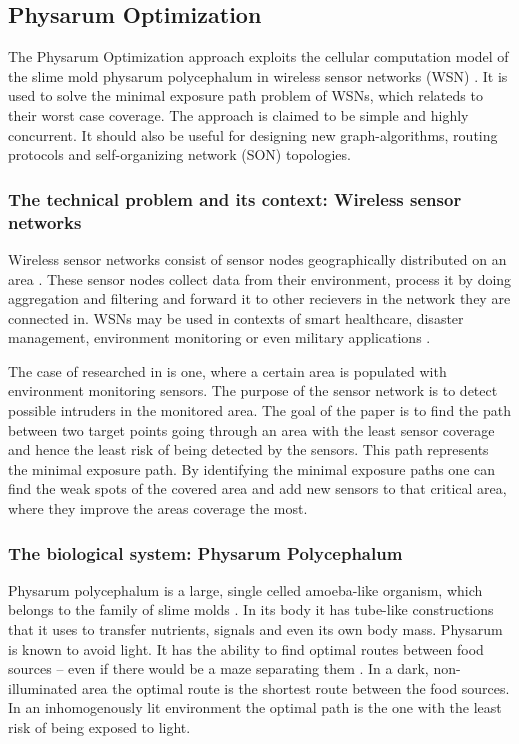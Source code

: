 \documentclass{IWORK2014}
\begin{document}

\subsection{Physarum Optimization}
The Physarum Optimization approach exploits the cellular computation model of the slime mold physarum polycephalum in wireless sensor networks (WSN) \cite{liu2012physarum}. It is used to solve the minimal exposure path problem of WSNs, which relateds to their worst case coverage. The approach is claimed to be simple and highly concurrent. It should also be useful for designing new graph-algorithms, routing protocols and self-organizing network (SON) topologies.

\subsubsection{The technical problem and its context: Wireless sensor networks}
Wireless sensor networks consist of sensor nodes geographically distributed on an area \cite{nazi2013robust}. These sensor nodes collect data from their environment, process it by doing aggregation and filtering and forward it to other recievers in the network they are connected in. WSNs may be used in contexts of smart healthcare, disaster management, environment monitoring \cite{nazi2013robust} or even military applications \cite{liu2012physarum}.

The case of researched in \cite{liu2012physarum} is one, where a certain area is populated with environment monitoring sensors. The purpose of the sensor network is to detect possible intruders in the monitored area. The goal of the paper is to find the path between two target points going through an area with the least sensor coverage and hence the least risk of being detected by the sensors. This path represents the minimal exposure path. By identifying the minimal exposure paths one can find the weak spots of the covered area and add new sensors to that critical area, where they improve the areas coverage the most.

\subsubsection{The biological system: Physarum Polycephalum}
Physarum polycephalum is a large, single celled amoeba-like organism, which belongs to the family of slime molds \cite{liu2012physarum}. In its body it has tube-like constructions that it uses to transfer nutrients, signals and even its own body mass. Physarum is known to avoid light. It has the ability to find optimal routes between food sources -- even if there would be a maze separating them \cite{nakagaki2000intelligence}. In a dark, non-illuminated area the optimal route is the shortest route between the food sources. In an inhomogenously lit environment the optimal path is the one with the least risk of being exposed to light.
\end{document}
